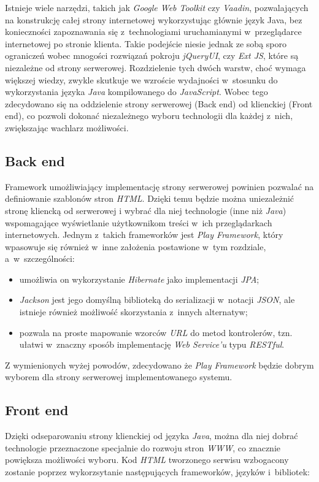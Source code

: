 \documentclass[11pt]{aghdpl}
\begin{document}
Istnieje wiele narzędzi, takich jak \emph{Google Web Toolkit} czy \emph{Vaadin}, pozwalających na konstrukcję całej strony internetowej wykorzystując głównie język Java, bez konieczności zapoznawania się z~technologiami uruchamianymi w~przeglądarce internetowej po stronie klienta. Takie podejście niesie jednak ze sobą sporo ograniczeń wobec mnogości rozwiązań pokroju \emph{jQueryUI}, czy \emph{Ext JS}, które są niezależne od strony serwerowej. Rozdzielenie tych dwóch warstw, choć wymaga większej wiedzy, zwykle skutkuje we wzroście wydajności w~stosunku do wykorzystania języka \emph{Java} kompilowanego do \emph{JavaScript}. Wobec tego zdecydowano się na oddzielenie strony serwerowej (Back end) od klienckiej (Front end), co pozwoli dokonać niezależnego wyboru technologii dla każdej z~nich, zwiększając wachlarz możliwości.

\subsection{Back end}

Framework umożliwiający implementację strony serwerowej powinien pozwalać na definiowanie szablonów stron \emph{HTML}. Dzięki temu będzie można uniezależnić stronę kliencką od serwerowej i wybrać dla niej technologie (inne niż \emph{Java}) wspomagające wyświetlanie użytkownikom treści w~ich przeglądarkach internetowych. Jednym z~takich frameworków jest \emph{Play Framework}, który wpasowuje się również w~inne założenia postawione w~tym rozdziale, a~w~szczególności:

\begin{itemize}
	\item umożliwia on wykorzystanie \emph{Hibernate} jako implementacji \emph{JPA};
	\item \emph{Jackson} jest jego domyślną biblioteką do serializacji w~notacji \emph{JSON}, ale istnieje również możliwość skorzystania z~innych alternatyw;
	\item pozwala na proste mapowanie wzorców \emph{URL} do metod kontrolerów, tzn. ułatwi w~znaczny sposób implementację \emph{Web Service'u} typu \emph{RESTful}.
\end{itemize}

Z wymienionych wyżej powodów, zdecydowano że \emph{Play Framework} będzie dobrym wyborem dla strony serwerowej implementowanego systemu.

\subsection{Front end}
Dzięki odseparowaniu strony klienckiej od języka \emph{Java}, można dla niej dobrać technologie przeznaczone specjalnie do rozwoju stron \emph{WWW}, co znacznie powiększa możliwości wyboru. Kod \emph{HTML} tworzonego serwisu wzbogacony zostanie poprzez wykorzsytanie następujących frameworków, języków i~bibliotek:
\end{document}
